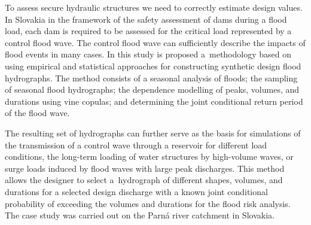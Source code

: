 \noindent

To assess secure hydraulic structures we need to correctly estimate design values. In Slovakia in the framework of the safety assessment of dams during a flood load, each dam is required to be assessed for the critical load represented by a control flood wave. The control flood wave can sufficiently describe the impacts of flood events in many cases. In this study is proposed a methodology based on using empirical and statistical approaches for constructing synthetic design flood hydrographs. The method consists of a seasonal analysis of floods; the sampling of seasonal flood hydrographs; the dependence modelling of peaks, volumes, and durations using vine copulas; and determining the joint conditional return period of the flood wave.

The resulting set of hydrographs can further serve as the basis for simulations of the transmission of a control wave through a reservoir for different load conditions, the long-term loading of water structures by high-volume waves, or surge loads induced by flood waves with large peak discharges. This method allows the designer to select a hydrograph of different shapes, volumes, and durations for a selected design discharge with a known joint conditional probability of exceeding the volumes and durations for the flood risk analysis. The case study was carried out on the Parná river catchment in Slovakia.





\newpage{}
{}
\begin{flushleft}






\end{flushleft}

